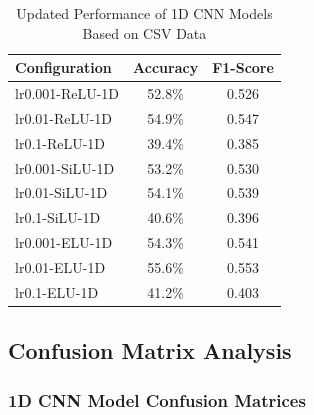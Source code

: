 \begin{table}[h]
\centering
\caption{Updated Performance of 1D CNN Models Based on CSV Data}
\label{tab:1d_results}
\begin{tabular}{@{}lcc@{}}
\toprule
\textbf{Configuration} & \textbf{Accuracy} & \textbf{F1-Score} \\
\midrule
lr0.001-ReLU-1D & 52.8\% & 0.526 \\
lr0.01-ReLU-1D & 54.9\% & 0.547 \\
lr0.1-ReLU-1D & 39.4\% & 0.385 \\
lr0.001-SiLU-1D & 53.2\% & 0.530 \\
lr0.01-SiLU-1D & 54.1\% & 0.539 \\
lr0.1-SiLU-1D & 40.6\% & 0.396 \\
lr0.001-ELU-1D & 54.3\% & 0.541 \\
lr0.01-ELU-1D & 55.6\% & 0.553 \\
lr0.1-ELU-1D & 41.2\% & 0.403 \\
\bottomrule
\end{tabular}
\end{table}

\subsection{Confusion Matrix Analysis}

\subsubsection{1D CNN Model Confusion Matrices}


